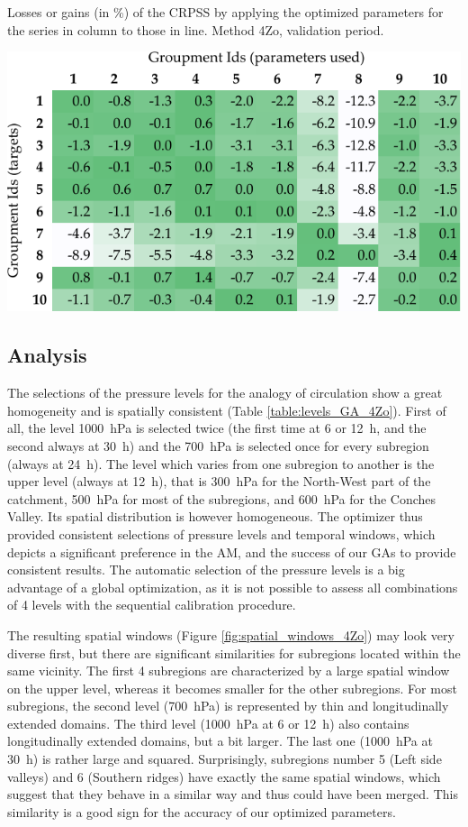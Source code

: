 \documentclass[5p]{elsarticle}
\begin{document}
\begin{table}[htbp]
	\caption{Losses or gains (in \%) of the CRPSS by applying the optimized parameters for the series in column to those in line. Method 4Zo, validation period.}
	\centerline{\includegraphics[width=\linewidth]{figures/table_crossing_z4_valid.pdf}}
	\label{table:crossing_4Zo_valid}
\end{table}


\subsection{Analysis}

The selections of the pressure levels for the analogy of circulation show a great homogeneity and is spatially consistent (Table \ref{table:levels_GA_4Zo}). First of all, the level 1000~hPa is selected twice (the first time at 6 or 12~h, and the second always at 30~h) and the 700~hPa is selected once for every subregion (always at 24~h). The level which varies from one subregion to another is the upper level (always at 12~h), that is 300~hPa for the North-West part of the catchment, 500~hPa for most of the subregions, and 600~hPa for the Conches Valley. Its spatial distribution is however homogeneous. The optimizer thus provided consistent selections of pressure levels and temporal windows, which depicts a significant preference in the AM, and the success of our GAs to provide consistent results. The automatic selection of the pressure levels is a big advantage of a global optimization, as it is not possible to assess all combinations of 4 levels with the sequential calibration procedure.

The resulting spatial windows (Figure \ref{fig:spatial_windows_4Zo}) may look very diverse first, but there are significant similarities for subregions located within the same vicinity. The first 4 subregions are characterized by a large spatial window on the upper level, whereas it becomes smaller for the other subregions. For most subregions, the second level (700~hPa) is represented by thin and longitudinally extended domains. The third level (1000~hPa at 6 or 12~h) also contains longitudinally extended domains, but a bit larger. The last one (1000~hPa at 30~h) is rather large and squared. Surprisingly, subregions number 5 (Left side valleys) and 6 (Southern ridges) have exactly the same spatial windows, which suggest that they behave in a similar way and thus could have been merged. This similarity is a good sign for the accuracy of our optimized parameters.
\end{document}

